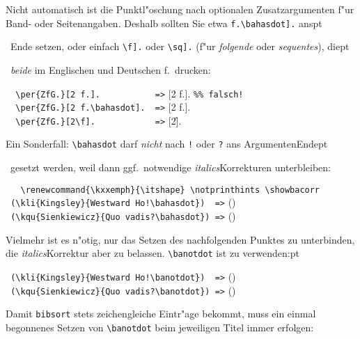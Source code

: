 \documentclass[12pt,a4paper]{article}
\newcommand{\pdfko}[1]{\kern #1pt
                          \strut\ignorespaces}%
\begin{document}
\vspace{1ex}\noindent
Nicht automatisch ist die Punktl"oschung nach optionalen Zusatzargumenten 
f"ur Band- oder Seitenangaben. Deshalb sollten Sie etwa 
\verb|f.\bahasdot].| \hspace{-.1em}ans\pdfko{1.75}\  
Ende setzen, oder einfach \verb|\f].| oder \verb|\sq].|  
(f"ur \textit{folgende} oder \textit{sequentes}), die\pdfko{1.75}\ 
\textit{beide} im Englischen und Deutschen f.\ drucken:

\vspace{1.25ex}\noindent
{\small
\verb+  [2 f.].           =>+ [2 f.]. \hspace{1cm} \verb|%% falsch!| \\
\verb+  [2 f.\bahasdot].  =>+ \per{ZfG.}[2 f.\bahasdot]. \\
\verb+  \per{ZfG.}[2\f].            =>+ \per{ZfG.}[2\f].
}

\vspace{1.5ex}\noindent
Ein Sonderfall: \verb|\bahasdot| darf \textit{nicht} 
nach \verb|!| oder \verb|?| ans Argumenten\hy Ende\pdfko{1}\ 
gesetzt werden, weil dann ggf.\ notwendige \textit{italics}\hy Korrekturen unterbleiben:

\vspace{1.25ex}\noindent
{\small
{\renewcommand{\kxxemph}{\itshape}\notprinthints \showbacorr 
 \verb|   \renewcommand{\kxxemph}{\itshape} \notprinthints \showbacorr| \\[.25ex]
 \verb+ (\kli{Kingsley}{Westward Ho!\bahasdot})  =>+ () \\
 \verb+ (\kqu{Sienkiewicz}{Quo vadis?\bahasdot}) =>+ ()
}}

\vspace{1.5ex}\noindent
Vielmehr ist es n"otig, nur das Setzen des nachfolgenden Punktes zu unterbinden,
die \textit{italics}\hy Korrektur aber zu belassen. \verb|\banotdot| ist zu verwenden:\pdfko{1}

\vspace{1.5ex}\noindent
{\small
{\renewcommand{\kxxemph}{\itshape}\showbacorr\notprinthints 
\verb+ (\kli{Kingsley}{Westward Ho!\banotdot})  =>+ () \\
\verb+ (\kqu{Sienkiewicz}{Quo vadis?\banotdot}) =>+ ()
}}

\vspace{1.75ex}\noindent
Damit \verb|bibsort| stets zeichengleiche Eintr"age bekommt, 
muss ein einmal begonnenes Setzen von \verb|\banotdot| beim 
jeweiligen Titel immer erfolgen:
\end{document}
